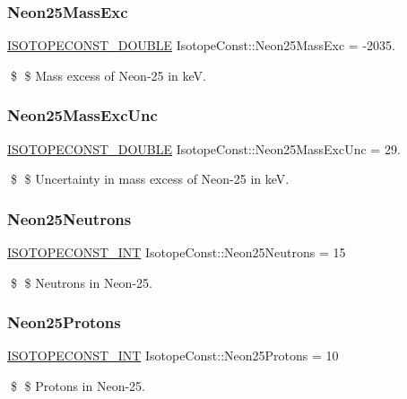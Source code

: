 \subsubsection{\texorpdfstring{Neon25\+Mass\+Exc}{Neon25MassExc}}
{\footnotesize\ttfamily \mbox{\hyperlink{group___isotope_const-_macros_ga8f45a7272ce02c0b4c65c44636ed719a}{I\+S\+O\+T\+O\+P\+E\+C\+O\+N\+S\+T\+\_\+\+D\+O\+U\+B\+LE}} Isotope\+Const\+::\+Neon25\+Mass\+Exc = -\/2035.}

\$ \$ Mass excess of Neon-\/25 in keV. \mbox{\label{group___isotope_const-_neon-_ne25_ga5d9ca92b9b9e4e41240693bf93190023}} 
\subsubsection{\texorpdfstring{Neon25\+Mass\+Exc\+Unc}{Neon25MassExcUnc}}
{\footnotesize\ttfamily \mbox{\hyperlink{group___isotope_const-_macros_ga8f45a7272ce02c0b4c65c44636ed719a}{I\+S\+O\+T\+O\+P\+E\+C\+O\+N\+S\+T\+\_\+\+D\+O\+U\+B\+LE}} Isotope\+Const\+::\+Neon25\+Mass\+Exc\+Unc = 29.}

\$ \$ Uncertainty in mass excess of Neon-\/25 in keV. \mbox{\label{group___isotope_const-_neon-_ne25_ga1617b2108dc86d32c794608e00a5dd8b}} 
\subsubsection{\texorpdfstring{Neon25\+Neutrons}{Neon25Neutrons}}
{\footnotesize\ttfamily \mbox{\hyperlink{group___isotope_const-_macros_ga5f18360b3e99483a35c32d789e62621c}{I\+S\+O\+T\+O\+P\+E\+C\+O\+N\+S\+T\+\_\+\+I\+NT}} Isotope\+Const\+::\+Neon25\+Neutrons = 15}

\$ \$ Neutrons in Neon-\/25. \mbox{\label{group___isotope_const-_neon-_ne25_gaf26492a4e882a8a30698c02563d1efb4}} 
\subsubsection{\texorpdfstring{Neon25\+Protons}{Neon25Protons}}
{\footnotesize\ttfamily \mbox{\hyperlink{group___isotope_const-_macros_ga5f18360b3e99483a35c32d789e62621c}{I\+S\+O\+T\+O\+P\+E\+C\+O\+N\+S\+T\+\_\+\+I\+NT}} Isotope\+Const\+::\+Neon25\+Protons = 10}

\$ \$ Protons in Neon-\/25. 